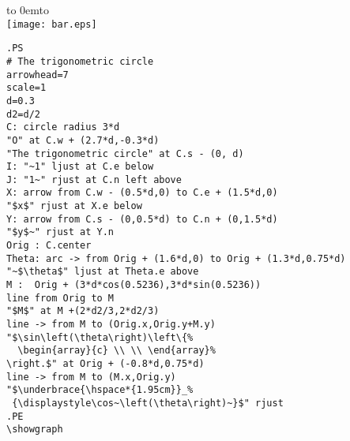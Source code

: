 \documentclass[12pt]{article}
\def\keymenu#1{\textcolor{red}{\underline{#1}}}
\def\advifooter{\vbox to 0em{\vbox to \vsize {\vfill
Press: \keymenu{n}ext page \keymenu{p}revious page
\keymenu{\textvisiblespace} next pause%
} \vss}}
\def\adviheader{\noindent
{\bf\Large \ActiveDVI}\\
\texttt{[image: bar.eps]}}
\let \Newpage \newpage
\def \newpage {\Newpage \advifooter\adviheader}
\def\adviquitfooter{\vbox to 0em{\vbox to \vsize {\vfill
\hfill Press: \keymenu{q} to quit%
} \vss}}
\def\lastpage{\Newpage\adviquitfooter\adviheader}
\begin{document}
\lastpage

\begin{small}
\begin{verbatim}
.PS
# The trigonometric circle
arrowhead=7
scale=1
d=0.3
d2=d/2
C: circle radius 3*d
"O" at C.w + (2.7*d,-0.3*d)
"The trigonometric circle" at C.s - (0, d)
I: "~1" ljust at C.e below
J: "1~" rjust at C.n left above
X: arrow from C.w - (0.5*d,0) to C.e + (1.5*d,0)
"$x$" rjust at X.e below
Y: arrow from C.s - (0,0.5*d) to C.n + (0,1.5*d)
"$y$~" rjust at Y.n
Orig : C.center
Theta: arc -> from Orig + (1.6*d,0) to Orig + (1.3*d,0.75*d)
"~$\theta$" ljust at Theta.e above
M :  Orig + (3*d*cos(0.5236),3*d*sin(0.5236))
line from Orig to M
"$M$" at M +(2*d2/3,2*d2/3)
line -> from M to (Orig.x,Orig.y+M.y)
"$\sin\left(\theta\right)\left\{%
  \begin{array}{c} \\ \\ \end{array}%
\right.$" at Orig + (-0.8*d,0.75*d)
line -> from M to (M.x,Orig.y)
"$\underbrace{\hspace*{1.95cm}}_%
 {\displaystyle\cos~\left(\theta\right)~}$" rjust
.PE
\showgraph
\end{verbatim}
\end{small}
\end{document}
